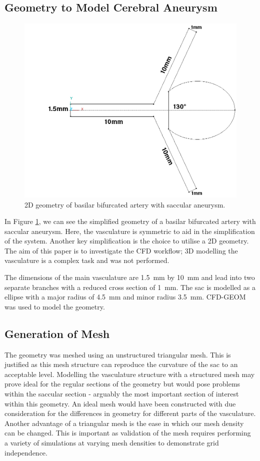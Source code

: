 \documentclass[journal,twoside,web]{ieeecolor}
\begin{document}
\subsection{Geometry to Model Cerebral Aneurysm}\label{geom}
\begin{figure}[!t]
    \centerline{\includegraphics[width=\columnwidth]{img/fig1.png}}
    \caption{2D geometry of basilar bifurcated artery with saccular aneurysm.}
    \label{fig1}
\end{figure}
In Figure \ref{fig1}, we can see the simplified geometry of a basilar bifurcated artery with saccular aneurysm. Here, the vasculature is symmetric to aid in the simplification of the system. Another key simplification is the choice to utilise a 2D geometry. The aim of this paper is to investigate the CFD workflow; 3D modelling the vasculature is a complex task and was not performed.

The dimensions of the main vasculature are \SI{1.5}{mm} by \SI{10}{mm} and lead into two separate branches with a reduced cross section of \SI{1}{mm}. The sac is modelled as a ellipse with a major radius of \SI{4.5}{mm} and minor radius \SI{3.5}{mm}. CFD-GEOM was used to model the geometry.
\subsection{Generation of Mesh}\label{mesh}
The geometry was meshed using an unstructured triangular mesh. This is justified as this mesh structure can reproduce the curvature of the sac to an acceptable level. Modelling the vasculature structure with a structured mesh may prove ideal for the regular sections of the geometry but would pose problems within the saccular section - arguably the most important section of interest within this geometry. An ideal mesh would have been constructed with due consideration for the differences in geometry for different parts of the vasculature. Another advantage of a triangular mesh is the ease in which our mesh density can be changed. This is important as validation of the mesh requires performing a variety of simulations at varying mesh densities to demonstrate grid independence.
\end{document}
